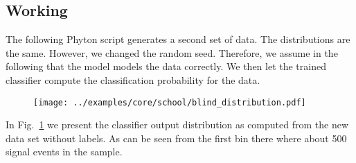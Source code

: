 \subsection{Working}

The following Phyton script generates a second set of data. The
distributions are the same. However, we changed the random
seed. Therefore, we assume in the following that the model models the
data correctly. We then let the trained classifier compute the
classification probability for the data.
%
\begin{changemargin}{1.5cm}{1.5cm} 
  
\end{changemargin}
%
%
\begin{figure}
  \centering
  \texttt{[image: ../examples/core/school/blind\_distribution.pdf]}
  \caption{}
  \label{fig:example_working}
\end{figure}
%
In Fig.~\ref{fig:example_working} we present the classifier output
distribution as computed from the new data set without labels. As can
be seen from the first bin there where about 500 signal events in the
sample.
